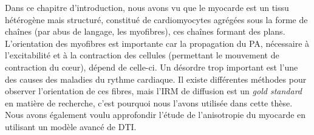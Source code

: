 Dans ce chapitre d'introduction, nous avons vu que le myocarde est un tissu hétérogène mais structuré, constitué de cardiomyocytes agrégées sous la forme de chaînes (par abus de langage, les myofibres), ces chaînes formant des plans. L'orientation des myofibres est importante car la propagation du PA, nécessaire à l'excitabilité et à la contraction des cellules (permettant le mouvement de contraction du cœur), dépend de celle-ci. Un désordre trop important est l'une des causes des maladies du rythme cardiaque. Il existe différentes méthodes pour observer l'orientation de ces fibres, mais l'IRM de diffusion est un \textit{gold standard} en matière de recherche, c'est pourquoi nous l'avons utilisée dans cette thèse. Nous avons également voulu approfondir l'étude de l'anisotropie du myocarde en utilisant un modèle avancé de DTI.



